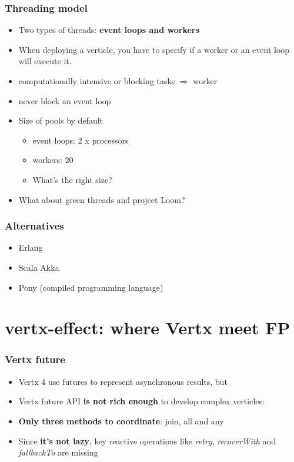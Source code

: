 \documentclass{beamer}
\begin{document}
\begin{frame}
\frametitle{Threading model}
\begin{itemize}
\item<1->Two types of threads: \textbf{event loops and workers}
\item<2-> When deploying a verticle, you have to specify if a worker or an event loop will execute it.
\item<3-> computationally intensive or blocking tasks $\Rightarrow$ worker
 \item<4-> never block an event loop
 \item<5-> Size of pools by default
 \begin{itemize}
          \item<6->event loops: 2 x processors
          \item<7->workers: 20
          \item<8->What's the right size?
 \end{itemize}     
 \item<9-> What about green threads and project Loom?    
\end{itemize}
\end{frame}

\begin{frame}
\frametitle{Alternatives}
\begin{itemize}
\item<1-> Erlang 
\item<2-> Scala Akka 
\item<3-> Pony (compiled programming language)
\end{itemize}
\end{frame}

\section{vertx-effect: where Vertx meet FP }
\begin{frame}
\frametitle{Vertx future}
 \begin{itemize}
          \item<1->Vertx 4 use futures to represent asynchronous results, but
          \item<2-> Vertx future API \textbf{is not rich enough} to develop complex verticles:
                 \item<3->\textbf{Only three methods to coordinate}: join, all and any
                 \item<4-> Since \textbf{it's not lazy}, key reactive operations like \textit{retry}, \textit{recoverWith} and \textit{fallbackTo} are missing                       

 \end{itemize}   
\end{frame}
\end{document}
